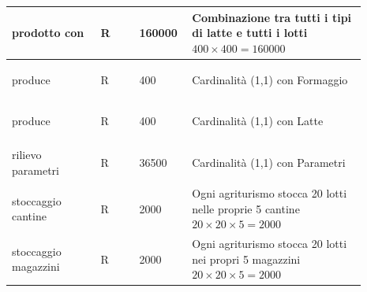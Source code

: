 \documentclass[12pt,a4paper]{article}
\begin{document}
\begin{center}
\begin{longtable}{|p{0.23\linewidth}|p{0.1\linewidth}|p{0.11\linewidth}|p{0.45\linewidth}|}
\hline
prodotto con 				& \begin{center}
\vspace{-25pt}R
\end{center}
					& \begin{center}
					\vspace{-25pt}160000\end{center}
					&  Combinazione tra tutti i tipi di latte e tutti i lotti $400\times 400 = 160000$\\ 

\hline
produce 				& \begin{center}
\vspace{-25pt}R
\end{center}
					& \begin{center}
					\vspace{-25pt}400\end{center}
					&  Cardinalità (1,1) con Formaggio \\ 

\hline
produce 				& \begin{center}
\vspace{-25pt}R
\end{center}
					& \begin{center}
					\vspace{-25pt}400\end{center}
					&  Cardinalità (1,1) con Latte \\ 

\hline
rilievo parametri 				& \begin{center}
\vspace{-25pt}R
\end{center}
					& \begin{center}
					\vspace{-25pt}36500\end{center}
					&  Cardinalità (1,1) con Parametri \\ 

\hline
stoccaggio cantine 				& \begin{center}
\vspace{-25pt}R
\end{center}
					& \begin{center}
					\vspace{-25pt}2000\end{center}
					&  Ogni agriturismo stocca 20 lotti nelle proprie 5 cantine $20\times 20 \times 5 = 2000$ \\ 

\hline
stoccaggio magazzini 				& \begin{center}
\vspace{-25pt}R
\end{center}
					& \begin{center}
					\vspace{-25pt}2000\end{center}
					&  Ogni agriturismo stocca 20 lotti nei propri 5 magazzini $20\times 20 \times 5 = 2000$ \\ 


\end{longtable}
\end{center}
\end{document}
